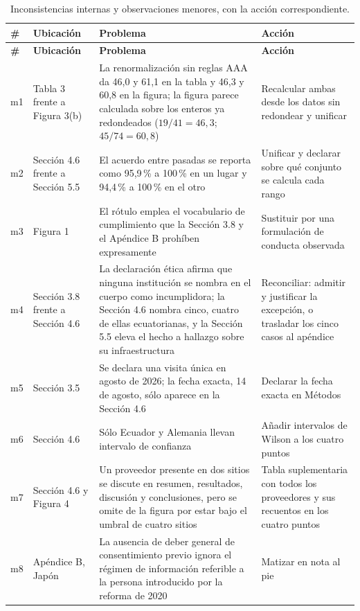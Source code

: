 \documentclass[11pt,a4paper]{article}
\begin{document}
\small
\begin{longtable}{@{}L{0.8cm}L{2.8cm}L{6.4cm}L{4.2cm}@{}}
	\caption{Inconsistencias internas y observaciones menores, con la acci\'on correspondiente.}\\
	\toprule
	\textbf{\#} & \textbf{Ubicaci\'on} & \textbf{Problema} & \textbf{Acci\'on} \\
	\midrule
	\endfirsthead
	\toprule
	\textbf{\#} & \textbf{Ubicaci\'on} & \textbf{Problema} & \textbf{Acci\'on} \\
	\midrule
	\endhead
	m1 & Tabla 3 frente a Figura 3(b) & La renormalizaci\'on sin reglas AAA da 46,0 y 61,1 en la tabla y 46,3 y 60,8 en la figura; la figura parece calculada sobre los enteros ya redondeados ($19/41 = 46{,}3$; $45/74 = 60{,}8$) & Recalcular ambas desde los datos sin redondear y unificar \\
	\addlinespace
	m2 & Secci\'on 4.6 frente a Secci\'on 5.5 & El acuerdo entre pasadas se reporta como 95,9\,\% a 100\,\% en un lugar y 94,4\,\% a 100\,\% en el otro & Unificar y declarar sobre qu\'e conjunto se calcula cada rango \\
	\addlinespace
	m3 & Figura 1 & El r\'otulo emplea el vocabulario de cumplimiento que la Secci\'on 3.8 y el Ap\'endice B proh\'iben expresamente & Sustituir por una formulaci\'on de conducta observada \\
	\addlinespace
	m4 & Secci\'on 3.8 frente a Secci\'on 4.6 & La declaraci\'on \'etica afirma que ninguna instituci\'on se nombra en el cuerpo como incumplidora; la Secci\'on 4.6 nombra cinco, cuatro de ellas ecuatorianas, y la Secci\'on 5.5 eleva el hecho a hallazgo sobre su infraestructura & Reconciliar: admitir y justificar la excepci\'on, o trasladar los cinco casos al ap\'endice \\
	\addlinespace
	m5 & Secci\'on 3.5 & Se declara una visita \'unica en agosto de 2026; la fecha exacta, 14 de agosto, s\'olo aparece en la Secci\'on 4.6 & Declarar la fecha exacta en M\'etodos \\
	\addlinespace
	m6 & Secci\'on 4.6 & S\'olo Ecuador y Alemania llevan intervalo de confianza & A\~nadir intervalos de Wilson a los cuatro puntos \\
	\addlinespace
	m7 & Secci\'on 4.6 y Figura 4 & Un proveedor presente en dos sitios se discute en resumen, resultados, discusi\'on y conclusiones, pero se omite de la figura por estar bajo el umbral de cuatro sitios & Tabla suplementaria con todos los proveedores y sus recuentos en los cuatro puntos \\
	\addlinespace
	m8 & Ap\'endice B, Jap\'on & La ausencia de deber general de consentimiento previo ignora el r\'egimen de informaci\'on referible a la persona introducido por la reforma de 2020 & Matizar en nota al pie \\

\end{longtable}
\end{document}
